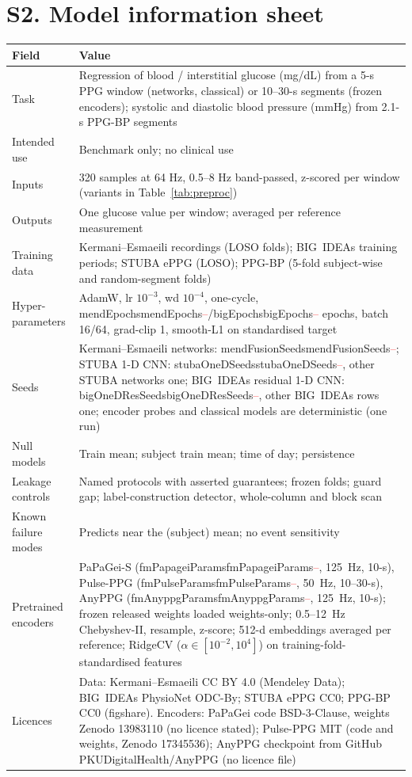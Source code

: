 \documentclass[journal,onecolumn]{IEEEtran}
\newcommand{\m}[1]{\ifcsname #1\endcsname\csname #1\endcsname\else\textcolor{red}{--}\fi}
\begin{document}
\section*{S2. Model information sheet}
\begin{longtable}{@{}p{2.6cm}p{5.5cm}@{}}
\toprule
\textbf{Field} & \textbf{Value} \\
\midrule
Task & Regression of blood / interstitial glucose (mg/dL) from a 5-s PPG window (networks, classical) or 10--30-s segments (frozen encoders); systolic and diastolic blood pressure (mmHg) from 2.1-s PPG-BP segments \\
Intended use & Benchmark only; no clinical use \\
Inputs & 320 samples at 64 Hz, 0.5--8 Hz band-passed, z-scored per window (variants in Table~\ref{tab:preproc}) \\
Outputs & One glucose value per window; averaged per reference measurement \\
Training data & Kermani--Esmaeili recordings (LOSO folds); BIG~IDEAs training periods; STUBA ePPG (LOSO); PPG-BP (5-fold subject-wise and random-segment folds) \\
Hyper-parameters & AdamW, lr $10^{-3}$, wd $10^{-4}$, one-cycle, \m{mendEpochs}/\m{bigEpochs} epochs, batch 16/64, grad-clip 1, smooth-L1 on standardised target \\
Seeds & Kermani--Esmaeili networks: \m{mendFusionSeeds}; STUBA 1-D CNN: \m{stubaOneDSeeds}, other STUBA networks one; BIG~IDEAs residual 1-D CNN: \m{bigOneDResSeeds}, other BIG~IDEAs rows one; encoder probes and classical models are deterministic (one run) \\
Null models & Train mean; subject train mean; time of day; persistence \\
Leakage controls & Named protocols with asserted guarantees; frozen folds; guard gap; label-construction detector, whole-column and block scan \\
Known failure modes & Predicts near the (subject) mean; no event sensitivity \\
Pretrained encoders & PaPaGei-S (\m{fmPapageiParams}, 125~Hz, 10-s), Pulse-PPG (\m{fmPulseParams}, 50~Hz, 10--30-s), AnyPPG (\m{fmAnyppgParams}, 125~Hz, 10-s); frozen released weights loaded weights-only; 0.5--12~Hz Chebyshev-II, resample, z-score; 512-d embeddings averaged per reference; RidgeCV ($\alpha\in[10^{-2},10^{4}]$) on training-fold-standardised features \\
Licences & Data: Kermani--Esmaeili CC BY 4.0 (Mendeley Data); BIG~IDEAs PhysioNet ODC-By; STUBA ePPG CC0; PPG-BP CC0 (figshare).  Encoders: PaPaGei code BSD-3-Clause, weights Zenodo 13983110 (no licence stated); Pulse-PPG MIT (code and weights, Zenodo 17345536); AnyPPG checkpoint from GitHub PKUDigitalHealth/AnyPPG (no licence file) \\
\bottomrule
\end{longtable}
\end{document}
